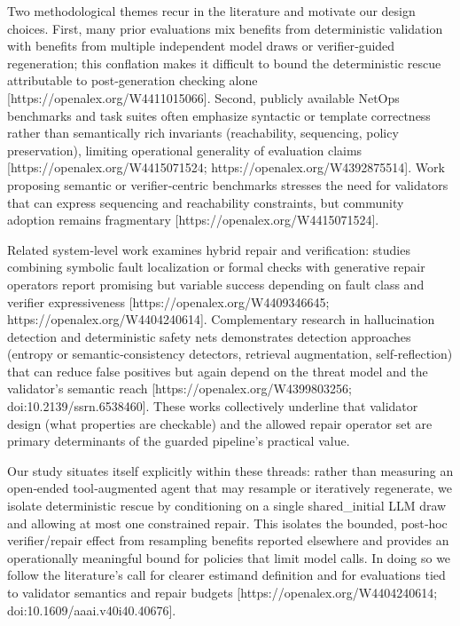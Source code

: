 \documentclass[conference]{IEEEtran}
\begin{document}
Two methodological themes recur in the literature and motivate our design choices. First, many prior evaluations mix benefits from deterministic validation with benefits from multiple independent model draws or verifier‑guided regeneration; this conflation makes it difficult to bound the deterministic rescue attributable to post‑generation checking alone [https://openalex.org/W4411015066]. Second, publicly available NetOps benchmarks and task suites often emphasize syntactic or template correctness rather than semantically rich invariants (reachability, sequencing, policy preservation), limiting operational generality of evaluation claims [https://openalex.org/W4415071524; https://openalex.org/W4392875514]. Work proposing semantic or verifier‑centric benchmarks stresses the need for validators that can express sequencing and reachability constraints, but community adoption remains fragmentary [https://openalex.org/W4415071524].

Related system‑level work examines hybrid repair and verification: studies combining symbolic fault localization or formal checks with generative repair operators report promising but variable success depending on fault class and verifier expressiveness [https://openalex.org/W4409346645; https://openalex.org/W4404240614]. Complementary research in hallucination detection and deterministic safety nets demonstrates detection approaches (entropy or semantic‑consistency detectors, retrieval augmentation, self‑reflection) that can reduce false positives but again depend on the threat model and the validator's semantic reach [https://openalex.org/W4399803256; doi:10.2139/ssrn.6538460]. These works collectively underline that validator design (what properties are checkable) and the allowed repair operator set are primary determinants of the guarded pipeline's practical value.

Our study situates itself explicitly within these threads: rather than measuring an open‑ended tool‑augmented agent that may resample or iteratively regenerate, we isolate deterministic rescue by conditioning on a single shared\_initial LLM draw and allowing at most one constrained repair. This isolates the bounded, post‑hoc verifier/repair effect from resampling benefits reported elsewhere and provides an operationally meaningful bound for policies that limit model calls. In doing so we follow the literature's call for clearer estimand definition and for evaluations tied to validator semantics and repair budgets [https://openalex.org/W4404240614; doi:10.1609/aaai.v40i40.40676].
\end{document}
